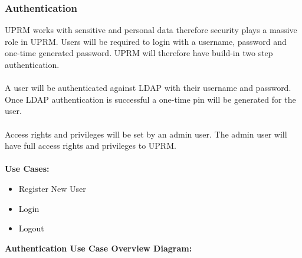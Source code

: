 
\subsubsection{Authentication}
UPRM works with sensitive and personal data therefore security plays a massive role in UPRM.
Users will be required to login with a username, password and one-time generated password. UPRM will therefore have build-in two step authentication. \\ \\
A user will be authenticated against LDAP with their username and password. Once LDAP authentication is successful a one-time pin will be generated for the user.\\ \\
Access rights and privileges will be set by an admin user. The admin user will have full access rights and privileges to UPRM.\\ \\
\textbf{Use Cases:}
\begin{itemize}
	\item Register New User
	\item Login
	\item Logout \\
\end{itemize}
\textbf{Authentication Use Case Overview Diagram:}\\
\centerline{}


